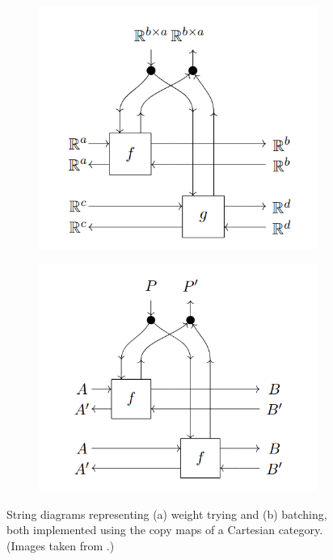 \documentclass[11pt,a4paper,openright,twoside]{report}
\theoremstyle{plain}
\theoremstyle{definition}
\begin{document}
\begin{figure}[h]
  \begin{center}
    \begin{subfigure}{0.3\textwidth}
      \includegraphics[width=\textwidth]{figures/weight_tying.png}
      \caption{}
    \end{subfigure}
    \begin{subfigure}{0.3\textwidth}
      \includegraphics[width=\textwidth]{figures/batching.png}
      \caption{}
    \end{subfigure}              
    \caption[Weight tying and batching]{String diagrams representing (a) weight trying and (b) batching, both implemented using the copy maps of a Cartesian category. (Images taken from \cite{cruttwell2022categorical}.)}
    \label{fig: weighttying}
  \end{center}
\end{figure}
\end{document}
